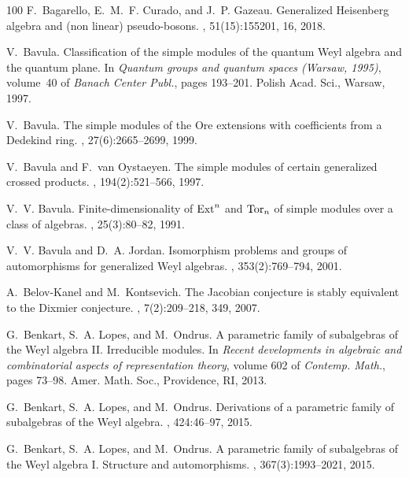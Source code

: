 \documentclass{commat}
\begin{document}
\begin{thebibliography}{100}
F.~Bagarello, E.~M.~F. Curado, and J.~P. Gazeau.
\newblock Generalized {H}eisenberg algebra and (non linear) pseudo-bosons.
, 51(15):155201, 16, 2018.

V.~Bavula.
\newblock Classification of the simple modules of the quantum {W}eyl algebra
  and the quantum plane.
\newblock In {\em Quantum groups and quantum spaces ({W}arsaw, 1995)},
  volume~40 of {\em Banach Center Publ.}, pages 193--201. Polish Acad. Sci.,
  Warsaw, 1997.

V.~Bavula.
\newblock The simple modules of the {O}re extensions with coefficients from a
  {D}edekind ring.
, 27(6):2665--2699, 1999.

V.~Bavula and F.~van Oystaeyen.
\newblock The simple modules of certain generalized crossed products.
, 194(2):521--566, 1997.

V.~V. Bavula.
\newblock Finite-dimensionality of {${\rm Ext}^n$} and {${\rm Tor}_n$} of
  simple modules over a class of algebras.
, 25(3):80--82, 1991.

V.~V. Bavula and D.~A. Jordan.
\newblock Isomorphism problems and groups of automorphisms for generalized
  {W}eyl algebras.
, 353(2):769--794, 2001.

A.~Belov-Kanel and M.~Kontsevich.
\newblock The {J}acobian conjecture is stably equivalent to the {D}ixmier
  conjecture.
, 7(2):209--218, 349, 2007.

G.~Benkart, S.~A. Lopes, and M.~Ondrus.
\newblock A parametric family of subalgebras of the {W}eyl algebra {II}.
  {I}rreducible modules.
\newblock In {\em Recent developments in algebraic and combinatorial aspects of
  representation theory}, volume 602 of {\em Contemp. Math.}, pages 73--98.
  Amer. Math. Soc., Providence, RI, 2013.

G.~Benkart, S.~A. Lopes, and M.~Ondrus.
\newblock Derivations of a parametric family of subalgebras of the {W}eyl
  algebra.
, 424:46--97, 2015.

G.~Benkart, S.~A. Lopes, and M.~Ondrus.
\newblock A parametric family of subalgebras of the {W}eyl algebra {I}.
  {S}tructure and automorphisms.
, 367(3):1993--2021, 2015.


\end{thebibliography}
\end{document}
